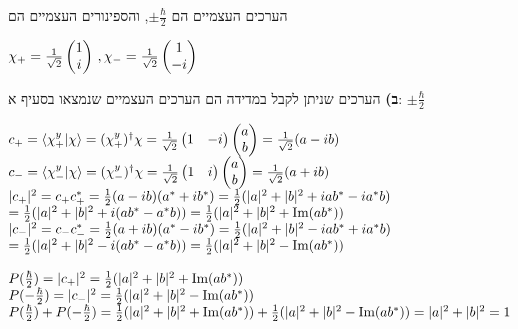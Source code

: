 \documentclass[14pt]{extarticle}
\makeatletter
\newenvironment{lefteqs}{%
    \begin{english}%
    \begin{flushleft}%
    \renewcommand{\arraystretch}{1.3}%
    $\begin{array}{@{}l@{}}%
}{%
    \end{array}$%
    \end{flushleft}%
    \end{english}%
}
\makeatother
\begin{document}
הערכים העצמיים הם $\pm \frac{\hbar}{2}$, והספינורים העצמיים הם
\begin{lefteqs}
    \chi_+ = \frac{1}{\sqrt{2}} \begin{pmatrix}
        1 \\
        i
    \end{pmatrix} \, , \chi_- = \frac{1}{\sqrt{2}} \begin{pmatrix}
        1 \\
        -i
    \end{pmatrix}
\end{lefteqs}

\textbf{ב)}
הערכים שניתן לקבל במדידה הם הערכים העצמיים שנמצאו בסעיף א: $\pm \frac{\hbar}{2}$

\begin{lefteqs}
    c_+ = \braket{\chi_+^y | \chi} = (\chi_+^y)^\dagger \chi = \frac{1}{\sqrt{2}}\begin{pmatrix}
        1 & -i
    \end{pmatrix} \begin{pmatrix}
        a \\
        b
    \end{pmatrix} = \frac{1}{\sqrt{2}}(a-ib) \\
    c_- = \braket{\chi_-^y | \chi} = (\chi_-^y)^\dagger \chi = \frac{1}{\sqrt{2}}\begin{pmatrix}
        1 & i
    \end{pmatrix} \begin{pmatrix}
        a \\
        b
    \end{pmatrix} = \frac{1}{\sqrt{2}}(a+ib) \\
    |c_+|^2 = c_+ c_+^* = \frac{1}{2}(a-ib)(a^* + ib^*) = \frac{1}{2}(|a|^2 + |b|^2 + iab^* -ia^*b) \\
    = \frac{1}{2}(|a|^2 + |b|^2 + i(ab^* - a^*b)) = \frac{1}{2}(|a|^2 + |b|^2 + \text{Im}(ab^*)) \\
    |c_-|^2 = c_- c_-^* = \frac{1}{2}(a+ib)(a^* - ib^*) = \frac{1}{2}(|a|^2 + |b|^2 - iab^* +ia^*b) \\
    = \frac{1}{2}(|a|^2 + |b|^2 - i(ab^* - a^*b)) = \frac{1}{2}(|a|^2 + |b|^2 - \text{Im}(ab^*)) \\
    \\
    P(\frac{\hbar}{2}) = |c_+|^2 = \frac{1}{2}(|a|^2 + |b|^2 + \text{Im}(ab^*)) \\
    P(-\frac{\hbar}{2}) = |c_-|^2 = \frac{1}{2}(|a|^2 + |b|^2 - \text{Im}(ab^*)) \\
    P(\frac{\hbar}{2}) + P(-\frac{\hbar}{2}) = \frac{1}{2}(|a|^2 + |b|^2 + \text{Im}(ab^*)) + \frac{1}{2}(|a|^2 + |b|^2 - \text{Im}(ab^*)) = |a|^2 + |b|^2 = 1
\end{lefteqs}
\end{document}
